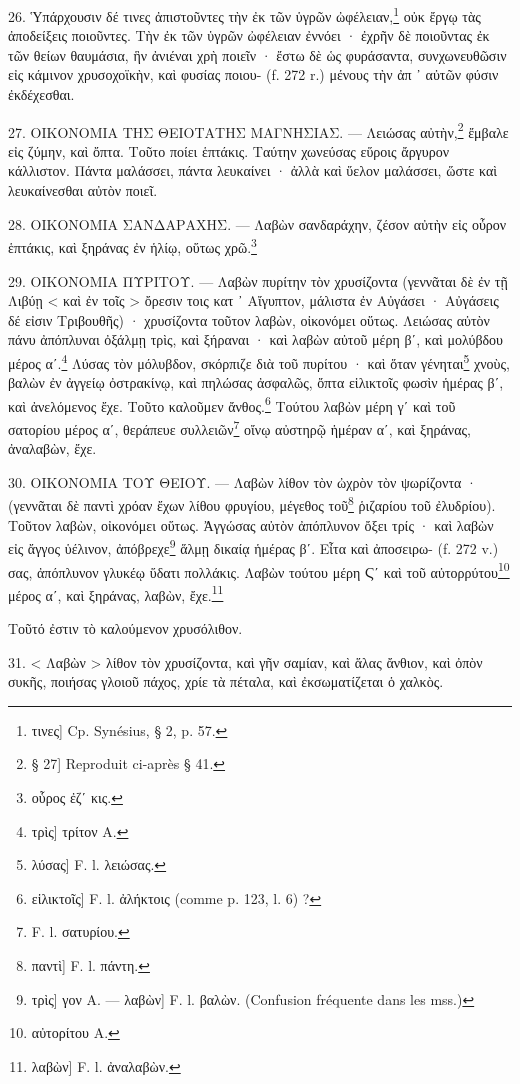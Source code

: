 \documentclass[a4paper, 11pt, oneside, polutonikogreek, french]{article}
\begin{document}
26. Ὑπάρχουσιν δέ τινες ἀπιστοῦντες τὴν ἐκ τῶν ὑγρῶν ὠφέλειαν,\footnote{τινες] Cp. Synésius, § 2, p. 57.} οὐκ ἔργῳ τὰς ἀποδείξεις ποιοῦντες. Τὴν ἐκ τῶν ὑγρῶν ὠφέλειαν ἐννόει · ἐχρῆν δὲ ποιοῦντας ἐκ τῶν θείων θαυμάσια, ἣν ἀνιέναι χρὴ ποιεῖν · ἔστω δὲ ὡς φυράσαντα, συνχωνευθῶσιν εἰς κάμινον χρυσοχοϊκὴν, καὶ φυσίας ποιου- (f. 272 r.) μένους τὴν ἀπ ᾽ αὐτῶν φύσιν ἐκδέχεσθαι.

27. ΟΙΚΟΝΟΜΙΑ ΤΗΣ ΘΕΙΟΤΑΤΗΣ ΜΑΓΝΗΣΙΑΣ. --- Λειώσας αὐτὴν,\footnote{§ 27] Reproduit ci-après § 41.} ἔμβαλε εἰς ζύμην, καὶ ὄπτα. Τοῦτο ποίει ἑπτάκις. Ταύτην χωνεύσας εὕροις ἄργυρον κάλλιστον. Πάντα μαλάσσει, πάντα λευκαίνει · ἀλλὰ καὶ ὕελον μαλάσσει, ὥστε καὶ λευκαίνεσθαι αὐτὸν ποιεῖ.

28. ΟΙΚΟΝΟΜΙΑ ΣΑΝΔΑΡΑΧΗΣ. --- Λαβὼν σανδαράχην, ζέσον αὐτὴν εἰς οὖρον ἑπτάκις, καὶ ξηράνας ἐν ἡλίῳ, οὕτως χρῶ.\footnote{οὗρος ἐζʹ κις.}

29. ΟΙΚΟΝΟΜΙΑ ΠΥΡΙΤΟΥ. --- Λαβὼν πυρίτην τὸν χρυσίζοντα (γεννᾶται δὲ ἐν τῇ Λιβύῃ < καὶ ἐν τοῖς > ὄρεσιν τοις κατ ᾽ Αἴγυπτον, μάλιστα ἐν Αὐγάσει · Αὐγάσεις δέ εἰσιν Τριβουθῆς) · χρυσίζοντα τοῦτον λαβὼν, οἰκονόμει οὕτως. Λειώσας αὐτὸν πάνυ ἀπόπλυναι ὀξάλμῃ τρὶς, καὶ ξήραναι · καὶ λαβὼν αὐτοῦ μέρη βʹ, καὶ μολύβδου μέρος αʹ.\footnote{τρὶς] τρίτον A.} Λύσας τὸν μόλυβδον, σκόρπιζε διὰ τοῦ πυρίτου · καὶ ὅταν γένηται\footnote{λύσας] F. l. λειώσας.} χνοὺς, βαλὼν ἐν ἀγγείῳ ὀστρακίνῳ, καὶ πηλώσας ἀσφαλῶς, ὄπτα εἱλικτοῖς φωσὶν ἡμέρας βʹ, καὶ ἀνελόμενος ἔχε. Τοῦτο καλοῦμεν ἄνθος.\footnote{εἱλικτοῖς] F. l. ἀλήκτοις (comme p. 123, l. 6) ?} Τούτου λαβὼν μέρη γʹ καὶ τοῦ σατορίου μέρος αʹ, θεράπευε συλλειῶν\footnote{F. l. σατυρίου.} οἴνῳ αὐστηρῷ ἡμέραν αʹ, καὶ ξηράνας, ἀναλαβὼν, ἔχε.

30. ΟΙΚΟΝΟΜΙΑ ΤΟΥ ΘΕΙΟΥ. --- Λαβὼν λίθον τὸν ὠχρὸν τὸν ψωρίζοντα · (γεννᾶται δὲ παντὶ χρόαν ἔχων λίθου φρυγίου, μέγεθος τοῦ\footnote{παντὶ] F. l. πάντη.} ῥιζαρίου τοῦ ἐλυδρίου). Τοῦτον λαβὼν, οἰκονόμει οὕτως. Ἀγγώσας αὐτὸν ἀπόπλυνον ὄξει τρίς · καὶ λαβὼν εἰς ἄγγος ὑέλινον, ἀπόβρεχε\footnote{τρὶς] γον A. --- λαβὼν] F. l. βαλὼν. (Confusion fréquente dans les mss.)} ἅλμῃ δικαίᾳ ἡμέρας βʹ. Εἶτα καὶ ἀποσειρω- (f. 272 v.) σας, ἀπόπλυνον γλυκέῳ ὕδατι πολλάκις. Λαβὼν τούτου μέρη Ϛʹ καὶ τοῦ αὐτορρύτου\footnote{αὐτορίτου A.} μέρος αʹ, καὶ ξηράνας, λαβὼν, ἔχε.\footnote{λαβὼν] F. l. ἀναλαβὼν.}

Τοῦτό ἐστιν τὸ καλούμενον χρυσόλιθον.

31. < Λαβὼν > λίθον τὸν χρυσίζοντα, καὶ γῆν σαμίαν, καὶ ἅλας ἄνθιον, καὶ ὀπὸν συκῆς, ποιήσας γλοιοῦ πάχος, χρίε τὰ πέταλα, καὶ ἐκσωματίζεται ὁ χαλκὸς.
\end{document}
